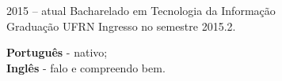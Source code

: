 \documentclass[9pt]{developercv} %
\begin{document}

\begin{entrylist}
    \entry
        {2015 -- atual}
        {Bacharelado em Tecnologia da Informação\\
            \footnotesize{Graduação}}
        {UFRN}
        {Ingresso no semestre 2015.2.}
\end{entrylist}


\begin{minipage}[t]{0.3\textwidth}
    \vspace{-\baselineskip} %

    
    \textbf{Português} - nativo;\\
    \textbf{Inglês} - falo e compreendo bem.\\
\end{minipage}
    
    
    
    

\end{document}
